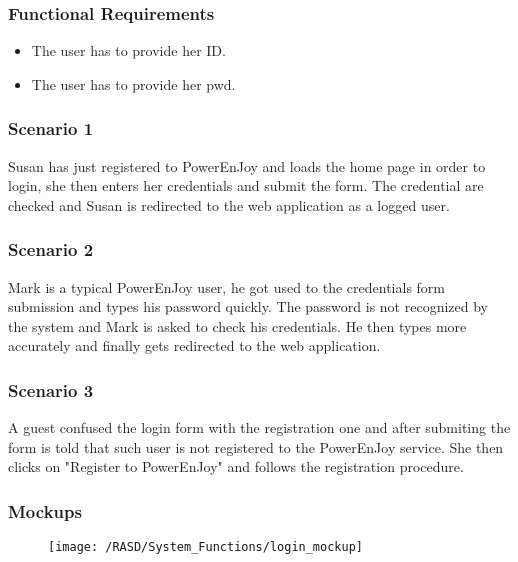 \subsubsection{Functional Requirements}
\begin{itemize}
  \item The user has to provide her \gls{ID}.
  \item The user has to provide her \gls{pwd}.
\end{itemize}

\subsubsection{Scenario 1}
Susan has just registered to PowerEnJoy and loads the home page in order to login, she then enters her credentials and submit the form. The credential are checked and Susan is redirected to the web application as a logged user.

\subsubsection{Scenario 2}
Mark is a typical PowerEnJoy user, he got used to the credentials form submission and types his password quickly. The password is not recognized by the system and Mark is asked to check his credentials. He then types more accurately and finally gets redirected to the web application. %

\subsubsection{Scenario 3}
A guest confused the login form with the registration one and after submiting the form is told that such user is not registered to the PowerEnJoy service. She then clicks on "Register to PowerEnJoy" and follows the registration procedure.


\subsubsection{Mockups}
\begin{figure}[!ht]
  \centering
  \vspace{0.2cm}
  \texttt{[image: /RASD/System\_Functions/login\_mockup]}\\
  \vspace{0.4cm}
  \label{fig:login_mockup} 
\end{figure}


